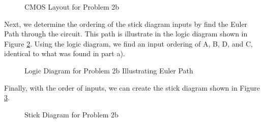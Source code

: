 \documentclass[fleqn]{article}
\begin{document}
\begin{enumerate}
\begin{enumerate}
			\begin{figure}[H]
				\centerline{}
				\caption{CMOS Layout for Problem 2b}
				\label{fig::cmos_layout_problem_2b}
			\end{figure}
			
			Next, we determine the ordering of the stick diagram inputs by find the Euler Path through the circuit. This path is illustrate in the logic diagram shown in Figure \ref{fig::logic_diagram_problem_2b}. Using the logic diagram, we find an input ordering of A, B, D, and C, identical to what was found in part a).
			
			\begin{figure}[H]
				\centerline{}
				\caption{Logic Diagram for Problem 2b Illustrating Euler Path}
				\label{fig::logic_diagram_problem_2b}
			\end{figure}
			
			Finally, with the order of inputs, we can create the stick diagram shown in Figure \ref{fig::stick_diagram_problem_2b}.
			
			\begin{figure}[H]
				\centerline{}
				\caption{Stick Diagram for Problem 2b}
				\label{fig::stick_diagram_problem_2b}
			\end{figure}
		\end{enumerate}
		

\end{enumerate}
\end{document}
